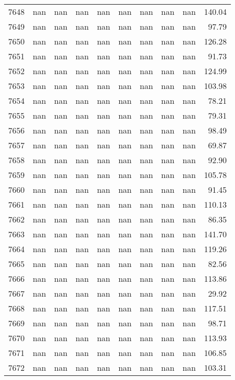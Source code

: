 \begin{tabular}{lrrrrrrrrr}
7648 & nan & nan & nan & nan & nan & nan & nan & nan & 140.04 \\
7649 & nan & nan & nan & nan & nan & nan & nan & nan & 97.79 \\
7650 & nan & nan & nan & nan & nan & nan & nan & nan & 126.28 \\
7651 & nan & nan & nan & nan & nan & nan & nan & nan & 91.73 \\
7652 & nan & nan & nan & nan & nan & nan & nan & nan & 124.99 \\
7653 & nan & nan & nan & nan & nan & nan & nan & nan & 103.98 \\
7654 & nan & nan & nan & nan & nan & nan & nan & nan & 78.21 \\
7655 & nan & nan & nan & nan & nan & nan & nan & nan & 79.31 \\
7656 & nan & nan & nan & nan & nan & nan & nan & nan & 98.49 \\
7657 & nan & nan & nan & nan & nan & nan & nan & nan & 69.87 \\
7658 & nan & nan & nan & nan & nan & nan & nan & nan & 92.90 \\
7659 & nan & nan & nan & nan & nan & nan & nan & nan & 105.78 \\
7660 & nan & nan & nan & nan & nan & nan & nan & nan & 91.45 \\
7661 & nan & nan & nan & nan & nan & nan & nan & nan & 110.13 \\
7662 & nan & nan & nan & nan & nan & nan & nan & nan & 86.35 \\
7663 & nan & nan & nan & nan & nan & nan & nan & nan & 141.70 \\
7664 & nan & nan & nan & nan & nan & nan & nan & nan & 119.26 \\
7665 & nan & nan & nan & nan & nan & nan & nan & nan & 82.56 \\
7666 & nan & nan & nan & nan & nan & nan & nan & nan & 113.86 \\
7667 & nan & nan & nan & nan & nan & nan & nan & nan & 29.92 \\
7668 & nan & nan & nan & nan & nan & nan & nan & nan & 117.51 \\
7669 & nan & nan & nan & nan & nan & nan & nan & nan & 98.71 \\
7670 & nan & nan & nan & nan & nan & nan & nan & nan & 113.93 \\
7671 & nan & nan & nan & nan & nan & nan & nan & nan & 106.85 \\
7672 & nan & nan & nan & nan & nan & nan & nan & nan & 103.31 \\

\end{tabular}
